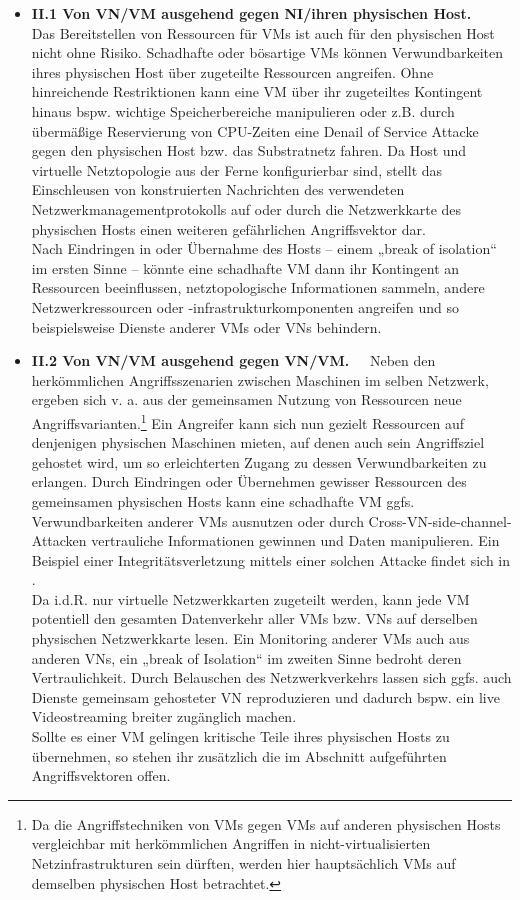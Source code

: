 \begin{itemize}
\item \textbf{II.1 Von VN/VM ausgehend gegen NI/ihren physischen Host.~~}
Das Bereitstellen von Ressourcen für VMs ist auch für den physischen Host nicht ohne Risiko. Schadhafte oder bösartige VMs können Verwundbarkeiten ihres physischen Host über zugeteilte Ressourcen angreifen. Ohne hinreichende Restriktionen kann eine VM über ihr zugeteiltes Kontingent hinaus bspw. wichtige Speicherbereiche manipulieren oder z.B. durch übermäßige Reservierung von CPU-Zeiten eine Denail of Service Attacke gegen den physischen Host bzw. das Substratnetz fahren. Da Host und virtuelle Netztopologie aus der Ferne konfigurierbar sind, stellt das Einschleusen von konstruierten Nachrichten des verwendeten Netzwerkmanagementprotokolls auf oder durch die Netzwerkkarte des physischen Hosts einen weiteren gefährlichen Angriffsvektor dar.\\
Nach Eindringen in oder Übernahme des Hosts -- einem „break of isolation“ im ersten Sinne \cite{wu2010network} -- könnte eine schadhafte VM dann ihr Kontingent an Ressourcen beeinflussen, netztopologische Informationen sammeln, andere Netzwerkressourcen oder -infrastrukturkomponenten angreifen und so beispielsweise Dienste anderer VMs oder VNs behindern.

\item \textbf{II.2 Von VN/VM ausgehend gegen VN/VM.~~}
Neben den herkömmlichen Angriffsszenarien zwischen Maschinen im selben Netzwerk, ergeben sich v. a. aus der gemeinsamen Nutzung von Ressourcen neue Angriffsvarianten.\footnote{Da die Angriffstechniken von VMs gegen VMs auf anderen physischen Hosts vergleichbar mit herkömmlichen Angriffen in nicht-virtualisierten Netzinfrastrukturen sein dürften, werden hier hauptsächlich VMs auf demselben physischen Host betrachtet.} 
Ein Angreifer kann sich nun gezielt Ressourcen auf denjenigen physischen Maschinen mieten, auf denen auch sein Angriffsziel gehostet wird, um so erleichterten Zugang zu dessen Verwundbarkeiten zu erlangen. Durch Eindringen oder Übernehmen gewisser Ressourcen des gemeinsamen physischen Hosts kann eine schadhafte VM ggfs. Verwundbarkeiten anderer VMs ausnutzen oder durch Cross-VN-side-channel-Attacken vertrauliche Informationen gewinnen und Daten manipulieren. Ein Beispiel einer Integritätsverletzung mittels einer solchen Attacke findet sich in \cite{ristenpart2009hey}. \\
Da i.d.R. nur virtuelle Netzwerkkarten zugeteilt werden, kann jede VM potentiell den gesamten Datenverkehr aller VMs bzw. VNs auf derselben physischen Netzwerkkarte lesen. Ein Monitoring anderer VMs auch aus anderen VNs, ein „break of Isolation“ im zweiten Sinne bedroht deren Vertraulichkeit. Durch Belauschen des Netzwerkverkehrs lassen sich ggfs. auch Dienste gemeinsam gehosteter VN reproduzieren und dadurch bspw. ein live Videostreaming breiter zugänglich machen. \cite{natarajansecurity}\\
Sollte es einer VM gelingen kritische Teile ihres physischen Hosts zu übernehmen, so stehen ihr zusätzlich die im Abschnitt \textit{} aufgeführten Angriffsvektoren offen.



\end{itemize}
